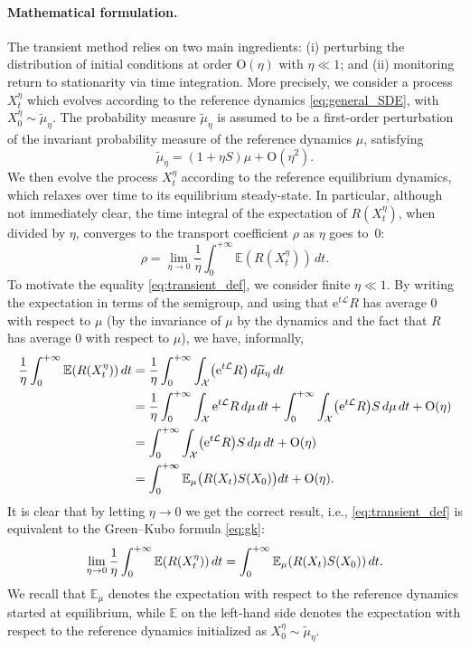 \documentclass[11pt]{article}
\newcommand{\E}{\mathbb{E}}
\newcommand{\e}{\mathrm{e}}
\renewcommand{\L}{\mathcal{L}}
\newcommand{\bigO}{\mathrm{O}}
\theoremstyle{definition}
\let\oldparagraph=\paragraph
\renewcommand\paragraph[1]{\oldparagraph{#1.}}
\newcommand{\psip}{\widetilde{\mu}_\eta}
\begin{document}
\paragraph{Mathematical formulation} The transient method relies on two main ingredients: (i) perturbing the distribution of initial conditions at order $\bigO(\eta)$ with $\eta\ll 1$; and (ii) monitoring return to stationarity via time integration. More precisely, we consider a process $X_t^\eta$ which evolves according to the reference dynamics \eqref{eq:general_SDE}, with $X_0^\eta \sim \psip$. The probability measure $\psip$ is assumed to be a first-order perturbation of the invariant probability measure of the reference dynamics $\mu$, satisfying
\begin{equation}
	\psip = (1+\eta S)\mu + \bigO(\eta^2).
	\label{eq:init_dist}
\end{equation}
We then evolve the process $X_t^\eta$ according to the reference equilibrium dynamics, which relaxes over time to its equilibrium steady-state. In particular, although not immediately clear, the time integral of the expectation of $R(X_t^\eta)$, when divided by $\eta$, converges to the transport coefficient $\rho$ as $\eta$ goes to~$0$:
\begin{equation}
	\rho = \lim_{\eta\to 0} \frac{1}{\eta}\int_0^{+\infty} \E(R(X_t^\eta)) \, dt.
	\label{eq:transient_def}
\end{equation}
To motivate the equality \eqref{eq:transient_def}, we consider finite $\eta\ll 1$. By writing the expectation in terms of the semigroup, and using that $\e^{t\L}R$ has average 0 with respect to $\mu$ (by the invariance of $\mu$ by the dynamics and the fact that $R$ has average 0 with respect to $\mu$), we have, informally,
\begin{align}
    \label{eq:gk_equiv1}
	\frac{1}{\eta}\int_0^{+\infty} \E(R(X_t^\eta)) \, dt &= \frac{1}{\eta} \int_0^{+\infty} \int_\mathcal{X} \bigl(\e^{t\L} R\bigr) \, d\psip \, dt \\
	&= \frac{1}{\eta}\int_0^{+\infty} \int_\mathcal{X} \e^{t\L} R \, d\mu \, dt + \int_0^{+\infty} \int_\mathcal{X} \bigl(\e^{t\L} R\bigr) S \, d\mu \, dt + \bigO(\eta) \notag\\
	&= \int_0^{+\infty} \int_\mathcal{X} \bigl(\e^{t\L} R\bigr) S \, d\mu \, dt + \bigO(\eta) \notag\\
	&= \int_0^{+\infty} \E_\mu\bigl(R(X_t)S(X_0)\bigr) dt + \bigO(\eta).
    \label{eq:gk_equiv2}
\end{align}
It is clear that by letting $\eta\to 0$ we get the correct result, i.e., \eqref{eq:transient_def} is equivalent to the Green--Kubo formula \eqref{eq:gk}:
\begin{equation}
    \notag
	\lim_{\eta\to 0}\frac{1}{\eta}\int_0^{+\infty} \E(R(X_t^\eta)) \, dt = \int_0^{+\infty} \E_\mu(R(X_t) S(X_0)) \, dt.
	\label{eq:td_gk}
\end{equation}
We recall that $\E_\mu$ denotes the expectation with respect to the reference dynamics started at equilibrium, while $\E$ on the left-hand side denotes the expectation with respect to the reference dynamics initialized as $X_0^\eta \sim \psip$.
\end{document}
